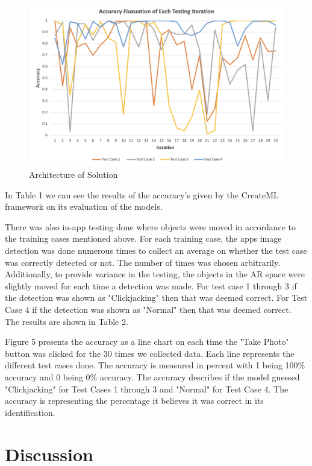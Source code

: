 \documentclass[conference]{IEEEtran}
\begin{document}
\begin{figure}[!t]
  \centering
  \includegraphics[width=\textwidth]{plot.png}
  \caption{Architecture of Solution}
  \label{fig:example}
\end{figure}

In Table 1 we can see the results of the accuracy's given by the CreateML framework on its evaluation of the models. 

There was also in-app testing done where objects were moved in accordance to the training cases mentioned above. For each training case, the apps image detection was done numerous times to collect an average on whether the test case was correctly detected or not. The number of times was chosen arbitrarily. Additionally, to provide variance in the testing, the objects in the AR space were slightly moved for each time a detection was made. For test case 1 through 3 if the detection was shown as "Clickjacking" then that was deemed correct. For Test Case 4 if the detection was shown as "Normal" then that was deemed correct. The results are shown in Table 2. 

Figure 5 presents the accuracy as a line chart on each time the "Take Photo" button was clicked for the 30 times we collected data. Each line represents the different test cases done. The accuracy is measured in percent with 1 being 100\% accuracy and 0 being 0\% accuracy. The accuracy describes if the model guessed "Clickjacking" for Test Cases 1 through 3 and "Normal" for Test Case 4. The accuracy is representing the percentage it believes it was correct in its identification.


\section{Discussion}
\end{document}
